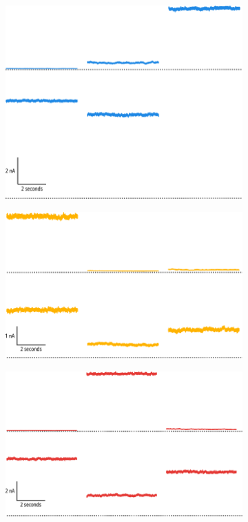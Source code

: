 \begin{figure}[h]
	\centering
	\begin{subfigure}[t]{0.3\textwidth}
		\caption{}\label{ch4fig:noise_example_1}
		\centering
		\includegraphics[width=\textwidth]{noise_example_1.pdf}
	\end{subfigure}
	\hfill
	\begin{subfigure}[t]{0.3\textwidth}
		\caption{}\label{ch4fig:noise_example_2}
		\centering
		\includegraphics[width=\textwidth]{noise_example_2.pdf}
	\end{subfigure}
	\hfill
	\begin{subfigure}[t]{0.3\textwidth}
		\caption{}\label{ch4fig:noise_example_3}
		\centering
		\includegraphics[width=\textwidth]{noise_example_3.pdf}

\end{subfigure}
\end{figure}
